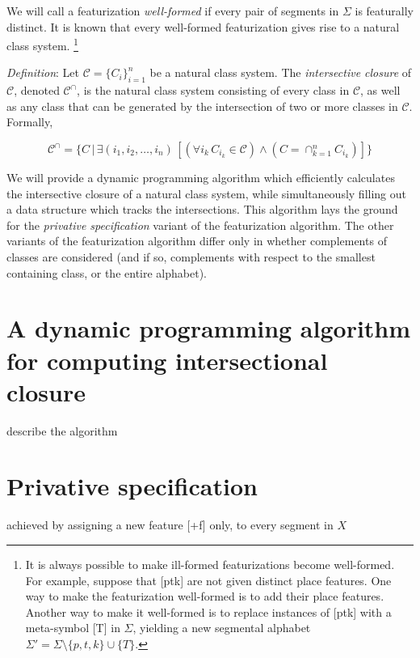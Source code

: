 \documentclass[11pt, oneside]{article}   	%
\begin{document}
\vspace{\baselineskip} \noindent We will call a featurization \textit{well-formed} if every pair of segments in $\Sigma$ is featurally distinct. It is known that every well-formed featurization gives rise to a natural class system. \footnote{It is always possible to make ill-formed featurizations become well-formed. For example, suppose that [ptk] are not given distinct place features. One way to make the featurization well-formed is to add their place features. Another way to make it well-formed is to replace instances of [ptk] with a meta-symbol [T] in $\Sigma$, yielding a new segmental alphabet $\Sigma ' = \Sigma \setminus \{p,t,k\} \cup \{T\}$.}

\vspace{\baselineskip} \noindent \textit{Definition}:
   Let $\mathcal C = \{C_i\}_{i=1}^n$ be a natural class system. The \textit{intersective closure} of $\mathcal C$, denoted $\mathcal C^\cap$, is the natural class system consisting of every class in $\mathcal C$, as well as any class that can be generated by the intersection of two or more classes in $\mathcal C$. Formally, 

$$ \mathcal C^\cap = \{C \, | \, \exists (i_1, i_2, \ldots, i_n) \, [(\forall i_k \, C_{i_k} \in \mathcal C)  \land (C = \cap_{k=1}^n C_{i_k})] \} $$

\vspace{\baselineskip} \noindent We will provide a dynamic programming algorithm which efficiently calculates the intersective closure of a natural class system, while simultaneously filling out a data structure which tracks the intersections. This algorithm lays the ground for the \textit{privative specification} variant of the featurization algorithm. The other variants of the featurization algorithm differ only in whether complements of classes are considered (and if so, complements with respect to the smallest containing class, or the entire alphabet).

\section{A dynamic programming algorithm for computing intersectional closure}
describe the algorithm

\section{Privative specification}
achieved by assigning a new feature [+f] only, to every segment in $X$
\end{document}
